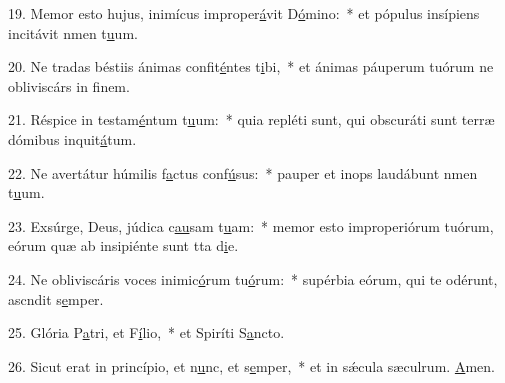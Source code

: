 19. Memor esto hujus, inimícus improper\uline{á}vit D\uline{ó}mino:~* et pópulus insípiens incitávit nmen t\uline{u}um.\par 
20. Ne tradas béstiis ánimas confit\uline{é}ntes t\uline{i}bi,~* et ánimas páuperum tuórum ne obliviscárs in f\uline{i}nem.\par 
21. Réspice in testam\uline{é}ntum t\uline{u}um:~* quia repléti sunt, qui obscuráti sunt terræ dómibus inquit\uline{á}tum.\par 
22. Ne avertátur húmilis f\uline{a}ctus conf\uline{ú}sus:~* pauper et inops laudábunt nmen t\uline{u}um.\par 
23. Exsúrge, Deus, júdica c\uline{au}sam t\uline{u}am:~* memor esto improperiórum tuórum, eórum quæ ab insipiénte sunt tta d\uline{i}e.\par 
24. Ne obliviscáris voces inimic\uline{ó}rum tu\uline{ó}rum:~* supérbia eórum, qui te odérunt, ascndit s\uline{e}mper.\par 
25. Glória P\uline{a}tri, et F\uline{í}lio,~* et Spiríti S\uline{a}ncto.\par 
26. Sicut erat in princípio, et n\uline{u}nc, et s\uline{e}mper,~* et in sǽcula sæculrum. \uline{A}men.\par 

